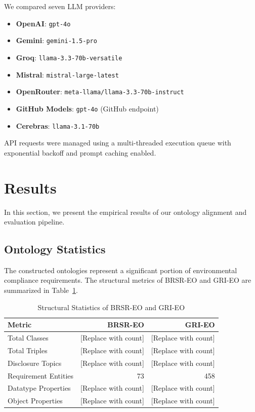 \documentclass[journal,compsoc]{IEEEtran}
\begin{document}
We compared seven LLM providers:
\begin{itemize}
    \item \textbf{OpenAI}: \texttt{gpt-4o}
    \item \textbf{Gemini}: \texttt{gemini-1.5-pro}
    \item \textbf{Groq}: \texttt{llama-3.3-70b-versatile}
    \item \textbf{Mistral}: \texttt{mistral-large-latest}
    \item \textbf{OpenRouter}: \texttt{meta-llama/llama-3.3-70b-instruct}
    \item \textbf{GitHub Models}: \texttt{gpt-4o} (GitHub endpoint)
    \item \textbf{Cerebras}: \texttt{llama-3.1-70b}
\end{itemize}
API requests were managed using a multi-threaded execution queue with exponential backoff and prompt caching enabled.

\section{Results}
In this section, we present the empirical results of our ontology alignment and evaluation pipeline.

\subsection{Ontology Statistics}
The constructed ontologies represent a significant portion of environmental compliance requirements. The structural metrics of BRSR-EO and GRI-EO are summarized in Table~\ref{tab:ont_stats}.

\begin{table}[h]
\centering
\caption{Structural Statistics of BRSR-EO and GRI-EO}
\label{tab:ont_stats}
\begin{tabular}{lrr}
\toprule
\textbf{Metric} & \textbf{BRSR-EO} & \textbf{GRI-EO} \\
\midrule
Total Classes & [Replace with count] & [Replace with count] \\
Total Triples & [Replace with count] & [Replace with count] \\
Disclosure Topics & [Replace with count] & [Replace with count] \\
Requirement Entities & 73 & 458 \\
Datatype Properties & [Replace with count] & [Replace with count] \\
Object Properties & [Replace with count] & [Replace with count] \\
\bottomrule
\end{tabular}
\end{table}
\end{document}
